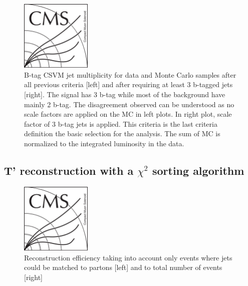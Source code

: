 \begin{figure}[!Hhtbp]
  \begin{center}
    \includegraphics[width=0.3\textwidth]{figs/CMSlogo.png}
    \caption{B-tag CSVM jet multiplicity for data and Monte Carlo
      samples after all previous criteria [left] and after requiring
      at least 3 b-tagged jets [right]. The signal has 3 b-tag while
      most of the background have mainly 2 b-tag. The disagreement
      observed can be understood as no scale factors
      are applied on the MC in left plots. In right plot, scale factor
      of 3 b-tag jets is applied.  This criteria is the
      last criteria definition the basic selection for the
      analysis. The sum of MC is normalized to the integrated
      luminosity in the data.}
    \label{fig:Nb}
  \end{center}
\end{figure}\clearpage

\subsection{T' reconstruction with a $\chi^{2}$ sorting algorithm}
\label{sec:chi2}

\begin{figure}[!Hhtbp]
  \begin{center}
    \includegraphics[width=0.3\textwidth]{figs/CMSlogo.png}
    \caption{Reconstruction efficiency taking into account only events where jets could be matched to partons [left] and to total number of events [right]}
    \label{fig:RecEff}
  \end{center}
\end{figure}\clearpage

